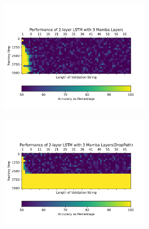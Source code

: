 \begin{figure}
\begin{subfigure}{0.5\textwidth}
\begin{center}
        \end{center}
    \end{subfigure}
    \begin{subfigure}{0.5\textwidth}
        \begin{center}
        \includegraphics[width=0.8\textwidth]{figures/parity_lstm_False_5_1.png.png}
        \end{center}
    \end{subfigure}\begin{subfigure}{0.5\textwidth}
        \begin{center}
        \includegraphics[width=0.8\textwidth]{figures/parity_lstm_True_5_1.png.png}
        \end{center}
    \end{subfigure}
    \begin{subfigure}{0.5\textwidth}
        \begin{center}

\end{center}
\end{subfigure}
\end{figure}
